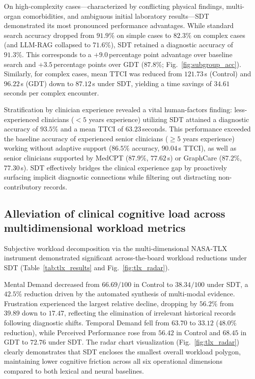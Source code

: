 \documentclass[12pt]{article}
\begin{document}
On high-complexity cases—characterized by conflicting physical findings, multi-organ comorbidities, and ambiguous initial laboratory results—SDT demonstrated its most pronounced performance advantages. While standard search accuracy dropped from $91.9\%$ on simple cases to $82.3\%$ on complex cases (and LLM-RAG collapsed to $71.6\%$), SDT retained a diagnostic accuracy of $91.3\%$. This corresponds to a $+9.0$\,percentage point advantage over baseline search and $+3.5$\,percentage points over GDT ($87.8\%$; Fig.~\ref{fig:subgroup_acc}). Similarly, for complex cases, mean TTCI was reduced from $121.73$\,s (Control) and $96.22$\,s (GDT) down to $87.12$\,s under SDT, yielding a time savings of $34.61$\,seconds per complex encounter.

Stratification by clinician experience revealed a vital human-factors finding: less-experienced clinicians ($<5$ years experience) utilizing SDT attained a diagnostic accuracy of $93.5\%$ and a mean TTCI of $63.23$\,seconds. This performance exceeded the baseline accuracy of experienced senior clinicians ($\ge 5$ years experience) working without adaptive support ($86.5\%$ accuracy, $90.04$\,s TTCI), as well as senior clinicians supported by MedCPT ($87.9\%$, $77.62$\,s) or GraphCare ($87.2\%$, $77.30$\,s). SDT effectively bridges the clinical experience gap by proactively surfacing implicit diagnostic connections while filtering out distracting non-contributory records.

\subsection*{Alleviation of clinical cognitive load across multidimensional workload metrics}

Subjective workload decomposition via the multi-dimensional NASA-TLX instrument demonstrated significant across-the-board workload reductions under SDT (Table~\ref{tab:tlx_results} and Fig.~\ref{fig:tlx_radar}).

Mental Demand decreased from $66.69/100$ in Control to $38.34/100$ under SDT, a $42.5\%$ reduction driven by the automated synthesis of multi-modal evidence. Frustration experienced the largest relative decline, dropping by $56.2\%$ from $39.89$ down to $17.47$, reflecting the elimination of irrelevant historical records following diagnostic shifts. Temporal Demand fell from $63.70$ to $33.12$ ($48.0\%$ reduction), while Perceived Performance rose from $56.42$ in Control and $68.45$ in GDT to $72.76$ under SDT. The radar chart visualization (Fig.~\ref{fig:tlx_radar}) clearly demonstrates that SDT encloses the smallest overall workload polygon, maintaining lower cognitive friction across all six operational dimensions compared to both lexical and neural baselines.
\end{document}
